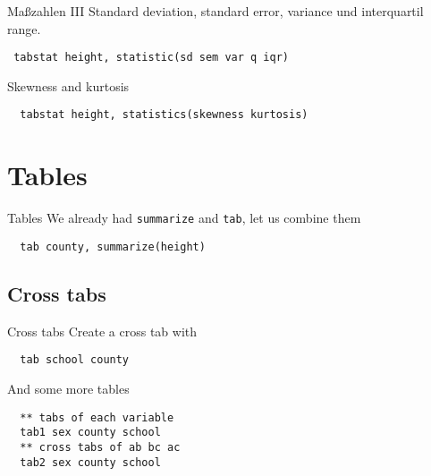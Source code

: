\begin{frame}[fragile]{Maßzahlen III}
Standard deviation, standard error, variance und interquartil range.              
\begin{lstlisting}
 tabstat height, statistic(sd sem var q iqr)
\end{lstlisting}
Skewness and kurtosis
\begin{lstlisting}
  tabstat height, statistics(skewness kurtosis)
\end{lstlisting}

\end{frame}

\section{Tables}
\begin{frame}[fragile]{Tables}   
We already had \texttt{summarize} and \texttt{tab}, let us combine them
\begin{lstlisting}
  tab county, summarize(height)
\end{lstlisting}
\end{frame}

\subsection{Cross tabs}
\begin{frame}[fragile]{Cross tabs}    
Create a cross tab with
\begin{lstlisting}
  tab school county
\end{lstlisting}
And some more tables
\begin{lstlisting}
  ** tabs of each variable
  tab1 sex county school
  ** cross tabs of ab bc ac
  tab2 sex county school
\end{lstlisting}
\end{frame}

